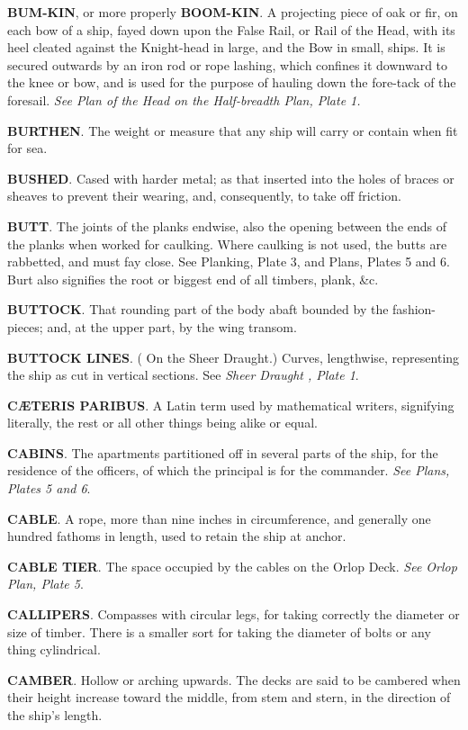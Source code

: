 \textbf{BUM-KIN}, or more properly \textbf{BOOM-KIN}. A projecting piece of oak or fir, on each bow of a ship, fayed down upon the False Rail, or Rail of the Head, with its heel cleated against the Knight-head in large, and the Bow in small, ships. It is secured outwards by an iron rod or rope lashing, which confines it downward to the knee or bow, and is used for the purpose of hauling down the fore-tack of the foresail. \textit{See Plan of the Head on the Half-breadth Plan, Plate 1.} 

\textbf{BURTHEN}. The weight or measure that any ship will carry or contain when fit for sea. 

\textbf{BUSHED}. Cased with harder metal; as that inserted into the holes of braces or sheaves to prevent their wearing, and, consequently, to take off friction. 

\textbf{BUTT}. The joints of the planks endwise, also the opening between the ends of the planks when worked for caulking. Where caulking is not used, the butts are rabbetted, and must fay close. See Planking, Plate 3, and Plans, Plates 5 and 6. Burt also signifies the root or biggest end of all timbers, plank, \&c. 

\textbf{BUTTOCK}. That rounding part of the body abaft bounded by the fashion-pieces; and, at the upper part, by the wing transom. 

\textbf{BUTTOCK LINES}. ( On the Sheer Draught.) Curves, lengthwise, representing the ship as cut in vertical sections. See \textit{Sheer Draught , Plate 1}. 

\textbf{CÆTERIS PARIBUS}. A Latin term used by mathematical writers, signifying literally, the rest or all other things being alike or equal. 

\textbf{CABINS}. The apartments partitioned off in several parts of the ship, for the residence of the officers, of which the principal is for the commander. \textit{See Plans, Plates 5 and 6}. 

\textbf{CABLE}. A rope, more than nine inches in circumference, and generally one hundred fathoms in length, used to retain the ship at anchor. 

\textbf{CABLE TIER}. The space occupied by the cables on the Orlop Deck. \textit{See Orlop Plan, Plate 5}. 

\textbf{CALLIPERS}. Compasses with circular legs, for taking correctly the diameter or size of timber. There is a smaller sort for taking the diameter of bolts or any thing cylindrical. 

\textbf{CAMBER}. Hollow or arching upwards. The decks are said to be cambered when their height increase toward the middle, from stem and stern, in the direction of the ship's length. 

